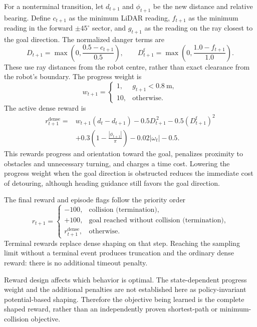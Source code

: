 \documentclass[11pt,a4paper]{article}
\theoremstyle{definition}
\theoremstyle{plain}
\theoremstyle{remark}
\begin{document}
For a nonterminal transition, let $d_{t+1}$ and $\phi_{t+1}$ be the new distance and relative bearing. Define $c_{t+1}$ as the minimum LiDAR reading, $f_{t+1}$ as the minimum reading in the forward $\pm45^\circ$ sector, and $g_{t+1}$ as the reading on the ray closest to the goal direction. The normalized danger terms are
\begin{equation}
 D_{t+1}=\max\!\left(0,\frac{0.5-c_{t+1}}{0.5}\right),\qquad
 D^{\mathrm f}_{t+1}=\max\!\left(0,\frac{1.0-f_{t+1}}{1.0}\right).
\end{equation}
These use ray distances from the robot centre, rather than exact clearance from the robot's boundary. The progress weight is
\begin{equation}
 w_{t+1}=\begin{cases}1,&g_{t+1}<0.8\ \mathrm m,\\10,&\text{otherwise}.\end{cases}
\end{equation}
The active dense reward is
\begin{align}
 r^{\mathrm{dense}}_{t+1}={}&w_{t+1}(d_t-d_{t+1})
 -0.5D_{t+1}^{\,2}-0.5(D^{\mathrm f}_{t+1})^2 \nonumber\\
 &+0.3\left(1-\frac{|\phi_{t+1}|}{\pi}\right)
 -0.02|\omega_t|-0.5.
 \label{eq:robot-reward}
\end{align}
This rewards progress and orientation toward the goal, penalizes proximity to obstacles and unnecessary turning, and charges a time cost. Lowering the progress weight when the goal direction is obstructed reduces the immediate cost of detouring, although heading guidance still favors the goal direction.

The final reward and episode flags follow the priority order
\begin{equation}
 r_{t+1}=\begin{cases}
 -100,&\text{collision (termination)},\\
 +100,&\text{goal reached without collision (termination)},\\
 r^{\mathrm{dense}}_{t+1},&\text{otherwise}.
 \end{cases}
 \label{eq:terminal-reward}
\end{equation}
Terminal rewards replace dense shaping on that step. Reaching the sampling limit without a terminal event produces truncation and the ordinary dense reward: there is no additional timeout penalty.

Reward design affects which behavior is optimal. The state-dependent progress weight and the additional penalties are not established here as policy-invariant potential-based shaping. Therefore the objective being learned is the complete shaped reward, rather than an independently proven shortest-path or minimum-collision objective.
\end{document}
